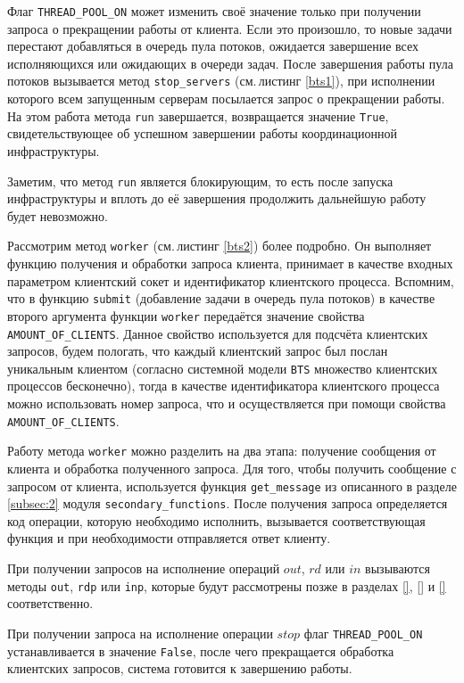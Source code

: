Флаг \texttt{THREAD_POOL_ON} может изменить своё значение только при получении запроса о прекращении работы от клиента. Если это произошло, то новые задачи перестают добавляться в очередь пула потоков, ожидается завершение всех исполняющихся или ожидающих в очереди задач. После завершения работы пула потоков вызывается метод \texttt{stop_servers} (см.\,листинг \ref{bts1}), при исполнении которого всем запущенным серверам посылается запрос о прекращении работы. На этом работа метода \texttt{run} завершается, возвращается значение \texttt{True}, свидетельствующее об успешном завершении работы координационной инфраструктуры.

Заметим, что метод \texttt{run} является блокирующим, то есть после запуска инфраструктуры и вплоть до её завершения продолжить дальнейшую работу будет невозможно.

Рассмотрим метод \texttt{worker} (см.\,листинг \ref{bts2}) более подробно. Он выполняет функцию получения и обработки запроса клиента, принимает в качестве входных параметром клиентский сокет и идентификатор клиентского процесса. Вспомним, что в функцию \texttt{submit} (добавление задачи в очередь пула потоков) в качестве второго аргумента функции \texttt{worker} передаётся значение свойства \texttt{AMOUNT_OF_CLIENTS}. Данное свойство используется для подсчёта клиентских запросов, будем пологать, что каждый клиентский запрос был послан уникальным клиентом (согласно системной модели \texttt{BTS} множество клиентских процессов бесконечно), тогда в качестве идентификатора клиентского процесса можно использовать номер запроса, что и осуществляется при помощи свойства \texttt{AMOUNT_OF_CLIENTS}.

Работу метода \texttt{worker} можно разделить на два этапа: получение сообщения от клиента и обработка полученного запроса. Для того, чтобы получить сообщение с запросом от клиента, используется функция \texttt{get_message} из описанного в разделе \ref{subsec:2} модуля \texttt{secondary\_functions}. После получения запроса определяется код операции, которую необходимо исполнить, вызывается соответствующая функция и при необходимости отправляется ответ клиенту.

При получении запросов на исполнение операций $out$, $rd$ или $in$ вызываются методы \texttt{out}, \texttt{rdp} или \texttt{inp}, которые будут рассмотрены позже в разделах \ref{}, \ref{} и \ref{} соответственно.

При получении запроса на исполнение операции $stop$ флаг \texttt{THREAD_POOL_ON} устанавливается в значение \texttt{False}, после чего прекращается обработка клиентских запросов, система готовится к завершению работы.


